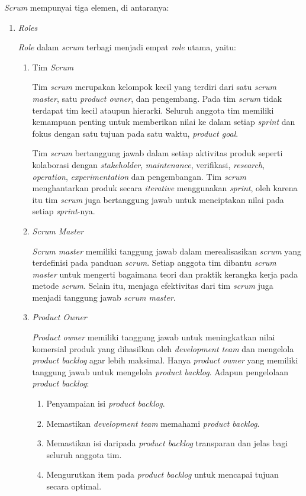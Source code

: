 \emph{Scrum} mempunyai tiga elemen, di antaranya:

\begin{enumerate}
	\item \emph{Roles}
	
	\emph{Role} dalam \emph{scrum} terbagi menjadi empat \emph{role} utama, yaitu:
	
	\begin{enumerate}
		\item Tim \emph{Scrum}
		
		Tim \emph{scrum} merupakan kelompok kecil yang terdiri dari satu \emph{scrum master}, satu \emph{product owner}, dan pengembang. Pada tim \emph{scrum} tidak terdapat tim kecil ataupun hierarki. Seluruh anggota tim memiliki kemampuan penting untuk memberikan nilai ke dalam setiap \emph{sprint} dan fokus dengan satu tujuan pada satu waktu, \emph{product goal}.
		
		Tim \emph{scrum} bertanggung jawab dalam setiap aktivitas produk seperti kolaborasi dengan \emph{stakeholder}, \emph{maintenance}, verifikasi, \emph{research}, \emph{operation}, \emph{experimentation} dan pengembangan. Tim \emph{scrum} menghantarkan produk secara \emph{iterative} menggunakan \emph{sprint}, oleh karena itu tim \emph{scrum} juga bertanggung jawab untuk menciptakan nilai pada setiap \emph{sprint}-nya.
		
		\break
		
		\item \emph{Scrum Master}
		
		\emph{Scrum master} memiliki tanggung jawab dalam merealisasikan \emph{scrum} yang terdefinisi pada panduan \emph{scrum}. Setiap anggota tim dibantu \emph{scrum master} untuk mengerti bagaimana teori dan praktik kerangka kerja pada metode \emph{scrum}. Selain itu, menjaga efektivitas dari tim \emph{scrum} juga menjadi tanggung jawab \emph{scrum master}.
		
		\item \emph{Product Owner}
		
		\emph{Product owner} memiliki tanggung jawab untuk meningkatkan nilai komersial produk yang dihasilkan oleh \emph{development team} dan mengelola \emph{product backlog} agar lebih maksimal. Hanya \emph{product owner} yang memiliki tanggung jawab untuk mengelola \emph{product backlog}. Adapun pengelolaan \emph{product backlog}:
		
		\begin{enumerate}
			\item Penyampaian isi \emph{product backlog}.
			\item Memastikan \emph{development team} memahami \emph{product backlog}.
			\item Memastikan isi daripada \emph{product backlog} transparan dan jelas bagi seluruh anggota tim.
			\item Mengurutkan item pada \emph{product backlog} untuk mencapai tujuan secara optimal.
			

\end{enumerate}
\end{enumerate}
\end{enumerate}
